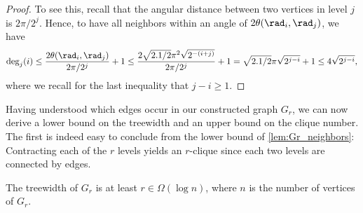 \begin{proof}
    To see this, recall that the angular distance between two vertices in level $ j $ is $ 2 \pi / 2^j $.
    Hence, to have all neighbors within an angle of $ 2 \theta(\rad_i,\rad_j) $, we have
    \begin{equation*}
        \deg_j(i) 
        \leq \frac{2 \theta(\rad_i,\rad_j)}{2 \pi / 2^j} + 1
        \leq \frac{2 \sqrt{2.1/2} \pi^2 \sqrt{2^{-(i+j)}}}{2\pi/2^j} + 1
        = \sqrt{2.1/2} \pi \sqrt{2^{j-i}} + 1
        \leq 4 \sqrt{2^{j-i}},
    \end{equation*}
    where we recall for the last inequality that $ j - i \geq 1 $.
\end{proof}
%
Having understood which edges occur in our constructed graph $ G_r $, we can now derive a lower bound on the treewidth and an upper bound on the clique number.
The first is indeed easy to conclude from the lower bound of \cref{lem:Gr_neighbors}: 
Contracting each of the $ r $ levels yields an $ r $-clique since each two levels are connected by edges.
%
\begin{corollary}\label{cor:Gr_tw_logn}
    The treewidth of $ G_r $ is at least $ r \in \Omega(\log n) $, where $ n $ is the number of vertices of $ G_r $.
\end{corollary}
%
%
%
%
%
%
%
%
% 
% 
